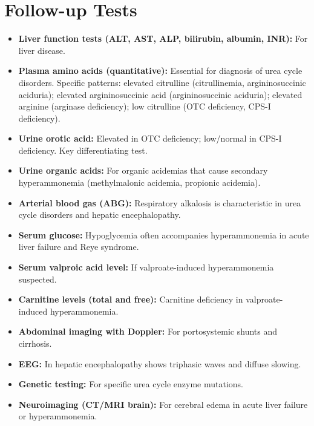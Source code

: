 \section*{Follow-up Tests}
\begin{itemize}
  \item \textbf{Liver function tests (ALT, AST, ALP, bilirubin, albumin, INR):} For liver disease.
  \item \textbf{Plasma amino acids (quantitative):} Essential for diagnosis of urea cycle disorders. Specific patterns: elevated citrulline (citrullinemia, argininosuccinic aciduria); elevated argininosuccinic acid (argininosuccinic aciduria); elevated arginine (arginase deficiency); low citrulline (OTC deficiency, CPS-I deficiency).
  \item \textbf{Urine orotic acid:} Elevated in OTC deficiency; low/normal in CPS-I deficiency. Key differentiating test.
  \item \textbf{Urine organic acids:} For organic acidemias that cause secondary hyperammonemia (methylmalonic acidemia, propionic acidemia).
  \item \textbf{Arterial blood gas (ABG):} Respiratory alkalosis is characteristic in urea cycle disorders and hepatic encephalopathy.
  \item \textbf{Serum glucose:} Hypoglycemia often accompanies hyperammonemia in acute liver failure and Reye syndrome.
  \item \textbf{Serum valproic acid level:} If valproate-induced hyperammonemia suspected.
  \item \textbf{Carnitine levels (total and free):} Carnitine deficiency in valproate-induced hyperammonemia.
  \item \textbf{Abdominal imaging with Doppler:} For portosystemic shunts and cirrhosis.
  \item \textbf{EEG:} In hepatic encephalopathy shows triphasic waves and diffuse slowing.
  \item \textbf{Genetic testing:} For specific urea cycle enzyme mutations.
  \item \textbf{Neuroimaging (CT/MRI brain):} For cerebral edema in acute liver failure or hyperammonemia.
\end{itemize}

